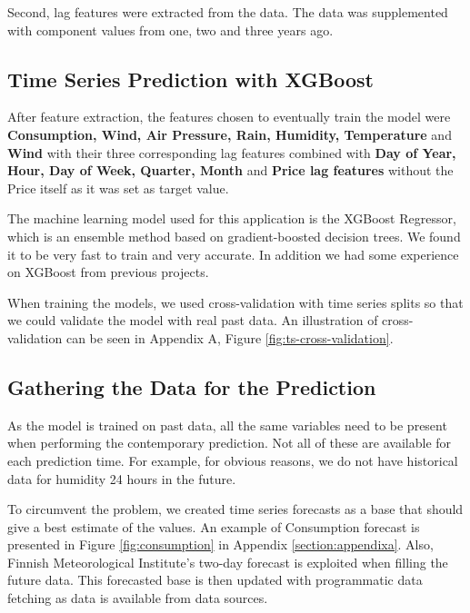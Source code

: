 \documentclass{article}
\begin{document}
Second, lag features were extracted from the data. The data was supplemented with component values from one, two and three years ago. %

\subsection{Time Series Prediction with XGBoost}
\label{subsection:xgboost}

After feature extraction, the features chosen to eventually train the model were \textbf{Consumption, Wind, Air Pressure, Rain, Humidity, Temperature} and \textbf{Wind} with their three corresponding lag features combined with \textbf{Day of Year, Hour, Day of Week, Quarter, Month} and \textbf{Price lag features} without the Price itself as it was set as target value.

The machine learning model used for this application is the XGBoost Regressor, which is an ensemble method based on gradient-boosted decision trees. We found it to be very fast to train and very accurate. In addition we had some experience on XGBoost from previous projects. 

When training the models, we used cross-validation with time series splits so that we could validate the model with real past data. An illustration of cross-validation can be seen in Appendix A, Figure \ref{fig:ts-cross-validation}.



\subsection{Gathering the Data for the Prediction}
\label{subsection:datafilling}

As the model is trained on past data, all the same variables need to be present when performing the contemporary prediction. Not all of these are available for each prediction time. For example, for obvious reasons, we do not have historical data for humidity 24 hours in the future.

To circumvent the problem, we created time series forecasts as a base that should give a best estimate of the values. An example of Consumption forecast is presented in Figure \ref{fig:consumption} in Appendix \ref{section:appendixa}. Also, Finnish Meteorological Institute's two-day forecast is exploited when filling the future data. This forecasted base is then updated with programmatic data fetching as data is available from data sources.
\end{document}
